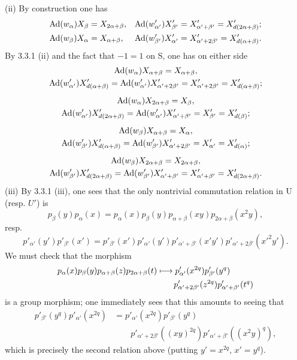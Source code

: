 (ii) By construction one has
\[
\begin{aligned}
\operatorname{Ad}(w_\alpha)X_\beta&=X_{2\alpha+\beta},&\operatorname{Ad}(w'_{\alpha'})X'_{\beta'}&=X'_{\alpha'+\beta'}=X'_{d(2\alpha+\beta)};\\
\operatorname{Ad}(w_\beta)X_\alpha&=X_{\alpha+\beta},&\operatorname{Ad}(w'_{\beta'})X'_{\alpha'}&=X'_{\alpha'+2\beta'}=X'_{d(\alpha+\beta)}.
\end{aligned}
\]
By 3.3.1 (ii) and the fact that $-1=1$ on S, one has on either side
\[
\begin{gathered}
\operatorname{Ad}(w_\alpha)X_{\alpha+\beta}=X_{\alpha+\beta},\\
\operatorname{Ad}(w'_{\alpha'})X'_{d(\alpha+\beta)}=\operatorname{Ad}(w'_{\alpha'})X'_{\alpha'+2\beta'}=X'_{\alpha'+2\beta'}=X'_{d(\alpha+\beta)};\\[.4em]
\operatorname{Ad}(w_\alpha)X_{2\alpha+\beta}=X_\beta,\\
\operatorname{Ad}(w'_{\alpha'})X'_{d(2\alpha+\beta)}=\operatorname{Ad}(w'_{\alpha'})X'_{\alpha'+\beta'}=X'_{\beta'}=X'_{d(\beta)};\\[.4em]
\operatorname{Ad}(w_\beta)X_{\alpha+\beta}=X_\alpha,\\
\operatorname{Ad}(w'_{\beta'})X'_{d(\alpha+\beta)}=\operatorname{Ad}(w'_{\beta'})X'_{\alpha'+2\beta'}=X'_{\alpha'}=X'_{d(\alpha)};\\[.4em]
\operatorname{Ad}(w_\beta)X_{2\alpha+\beta}=X_{2\alpha+\beta},\\
\operatorname{Ad}(w'_{\beta'})X'_{d(2\alpha+\beta)}=\operatorname{Ad}(w'_{\beta'})X'_{\alpha'+\beta'}=X'_{\alpha'+\beta'}=X'_{d(2\alpha+\beta)}.
\end{gathered}
\]
(iii) By 3.3.1 (iii), one sees that the only nontrivial commutation relation in U (resp. $U'$) is
\[
p_\beta(y)p_\alpha(x)=p_\alpha(x)p_\beta(y)p_{\alpha+\beta}(xy)p_{2\alpha+\beta}(x^2y),
\]
resp.
\[
p'_{\alpha'}(y')p'_{\beta'}(x')=p'_{\beta'}(x')p'_{\alpha'}(y')p'_{\alpha'+\beta'}(x'y')p'_{\alpha'+2\beta'}(x'^2y').
\]
We must check that the morphism
\[
\begin{aligned}
p_\alpha(x)p_\beta(y)p_{\alpha+\beta}(z)p_{2\alpha+\beta}(t)
&\longmapsto p'_{\alpha'}(x^{2q})p'_{\beta'}(y^q)\\
&\qquad p'_{\alpha'+2\beta'}(z^{2q})p'_{\alpha'+\beta'}(t^q)
\end{aligned}
\]
is a group morphism; one immediately sees that this amounts to seeing that
\[
\begin{aligned}
p'_{\beta'}(y^q)p'_{\alpha'}(x^{2q})&=p'_{\alpha'}(x^{2q})p'_{\beta'}(y^q)\\
&\qquad p'_{\alpha'+2\beta'}((xy)^{2q})p'_{\alpha'+\beta'}((x^2y)^q),
\end{aligned}
\]
which is precisely the second relation above (putting $y'=x^{2q}$, $x'=y^q$).
